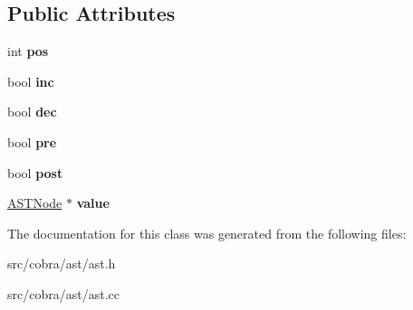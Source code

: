 \subsection*{Public Attributes}
\begin{DoxyCompactItemize}
\item 
\hypertarget{class_cobra_1_1internal_1_1_a_s_t_ident_ab097c56a4c95a65cb9d1396fcbfcbca8}{int {\bfseries pos}}\label{class_cobra_1_1internal_1_1_a_s_t_ident_ab097c56a4c95a65cb9d1396fcbfcbca8}

\item 
\hypertarget{class_cobra_1_1internal_1_1_a_s_t_ident_a2cab07f99a65917af3a354f99fbbd763}{bool {\bfseries inc}}\label{class_cobra_1_1internal_1_1_a_s_t_ident_a2cab07f99a65917af3a354f99fbbd763}

\item 
\hypertarget{class_cobra_1_1internal_1_1_a_s_t_ident_a51b08c5ac2daa8c97ad2ccf978b946a4}{bool {\bfseries dec}}\label{class_cobra_1_1internal_1_1_a_s_t_ident_a51b08c5ac2daa8c97ad2ccf978b946a4}

\item 
\hypertarget{class_cobra_1_1internal_1_1_a_s_t_ident_aa159b779de1eeb047d3ba7a0977d4e5f}{bool {\bfseries pre}}\label{class_cobra_1_1internal_1_1_a_s_t_ident_aa159b779de1eeb047d3ba7a0977d4e5f}

\item 
\hypertarget{class_cobra_1_1internal_1_1_a_s_t_ident_a0183fff508335a94f78c6ea6050b1574}{bool {\bfseries post}}\label{class_cobra_1_1internal_1_1_a_s_t_ident_a0183fff508335a94f78c6ea6050b1574}

\item 
\hypertarget{class_cobra_1_1internal_1_1_a_s_t_ident_a95f693066082ffed605899d41f37c3a5}{\hyperlink{class_cobra_1_1internal_1_1_a_s_t_node}{A\+S\+T\+Node} $\ast$ {\bfseries value}}\label{class_cobra_1_1internal_1_1_a_s_t_ident_a95f693066082ffed605899d41f37c3a5}

\end{DoxyCompactItemize}


The documentation for this class was generated from the following files\+:\begin{DoxyCompactItemize}
\item 
src/cobra/ast/ast.\+h\item 
src/cobra/ast/ast.\+cc\end{DoxyCompactItemize}
